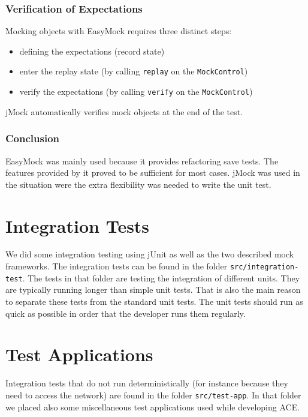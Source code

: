 \subsubsection{Verification of Expectations}
Mocking objects with EasyMock requires three distinct steps:

\begin{itemize}
 \item defining the expectations (record state)
 \item enter the replay state (by calling \texttt{replay} on the 
       \texttt{MockControl})
 \item verify the expectations (by calling \texttt{verify} on  the
       \texttt{MockControl})
\end{itemize}

jMock automatically verifies mock objects at the end of the test. 

\subsubsection{Conclusion}
EasyMock was mainly used because it provides refactoring save tests. The
features provided by it proved to be sufficient for most cases. jMock
was used in the situation were the extra flexibility was needed to write
the unit test.


\section{Integration Tests}
We did some integration testing using jUnit as well as the two described
mock frameworks. The integration tests can be found in the folder
\texttt{src/integration-test}. The tests in that folder are testing the
integration of different units. They are typically running longer than
simple unit tests. That is also the main reason to separate these tests
from the standard unit tests. The unit tests should run as quick as
possible in order that the developer runs them regularly.



\section{Test Applications}
Integration tests that do not run deterministically (for instance
because they need to access the network) are found in the folder
\texttt{src/test-app}. In that folder we placed also some miscellaneous
test applications used while developing ACE.




